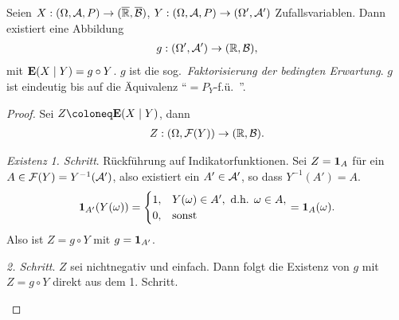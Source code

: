\begin{prop}
\label{prop:10.3}
Seien $X: (\Omega, {\AA}, P)\to (\RA,\overline{\BB})$, $Y: (\Omega, {\AA}, P)
\to (\Omega ', {\AA}')$ Zufallsvariablen. Dann existiert eine Abbildung
\begin{align*}
g: (\Omega ', {\AA}') \to (\R, {\BB}),
\end{align*}
mit $\E(X\mid Y) = g \circ Y$. $g$ ist die sog.\ \emph{Faktorisierung der
bedingten Erwartung}.
$g$ ist eindeutig bis auf die Äquivalenz ``$=P_{Y}$-f.ü.\ ''.\maphere
\end{prop}
\begin{proof}
Sei $Z\defl \E(X\mid Y)$, dann
\begin{align*}
Z: (\Omega,\FF(Y)) \to (\R,\BB).
\end{align*}
\begin{proofenum}
\item \textit{Existenz}
\textit{1. Schritt}. Rückführung auf Indikatorfunktionen. Sei $Z=\Id_A$ für
ein $A\in\FF(Y)=Y^{-1}(\AA')$, also existiert ein $A'\in\AA'$, so dass
$Y^{-1}(A') = A$.
\begin{align*}
\Id_{A'}(Y(\omega)) = 
\begin{cases}
1, & Y(\omega)\in A',\text{ d.h. }\omega\in A,\\
0, & \text{sonst} 
\end{cases}
= \Id_A(\omega).
\end{align*}
Also ist $Z=g\circ Y$ mit $g=\Id_{A'}$.

\textit{2. Schritt}. $Z$ sei nichtnegativ und einfach. Dann folgt die Existenz
von $g$ mit $Z=g\circ Y$ direkt aus dem 1. Schritt.


\end{proofenum}
\end{proof}
